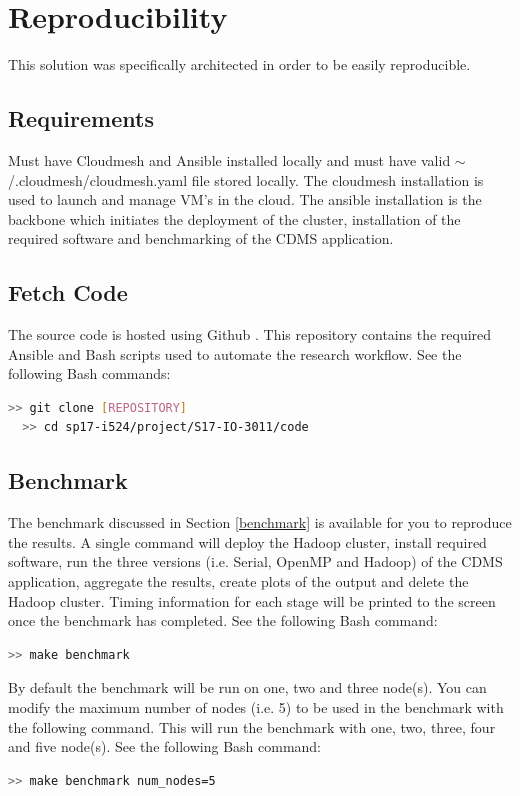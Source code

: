 \documentclass[9pt,twocolumn,twoside]{../../styles/osajnl}
\begin{document}
\section{Reproducibility} \label{reproducibility}
This solution was specifically architected in order to be easily
reproducible. 
\subsection{Requirements} \label{req}
Must have Cloudmesh and Ansible installed locally and must have valid
$\sim$/.cloudmesh/cloudmesh.yaml file stored locally. The cloudmesh
installation is used to launch and manage VM's in the cloud. The
ansible installation is the backbone which initiates the deployment of
the cluster, installation of the required software and benchmarking of
the CDMS application.
\subsection{Fetch Code} \label{git}
The source code is hosted using Github \cite{i524-github}. This
repository contains the required Ansible and Bash scripts used to
automate the research workflow.
\noindent See the following Bash commands:
\begin{lstlisting}[language=bash]
  >> git clone [REPOSITORY]
  >> cd sp17-i524/project/S17-IO-3011/code
\end{lstlisting}
\subsection{Benchmark} \label{benchmark-info}
The benchmark discussed in Section \ref{benchmark} is available for
you to reproduce the results. A single command will deploy the Hadoop
cluster, install required software, run the three versions
(i.e. Serial, OpenMP and Hadoop) of the CDMS application, aggregate
the results, create plots of the output and delete the Hadoop
cluster. Timing information for each stage will be printed to the
screen once the benchmark has completed.
\noindent See the following Bash command:
\begin{lstlisting}[language=bash]
  >> make benchmark
\end{lstlisting}
By default the benchmark will be run on one, two and three
node(s). You can modify the maximum number of nodes (i.e. 5) to be
used in the benchmark with the following command. This will run the
benchmark with one, two, three, four and five node(s).
\noindent See the following Bash command:
\begin{lstlisting}[language=bash]
  >> make benchmark num_nodes=5
\end{lstlisting}
\end{document}
